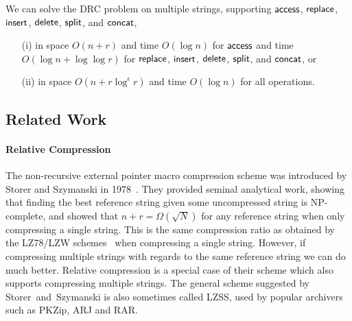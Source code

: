 \begin{theorem}\label{thm:extension2}
We can solve the DRC problem on multiple strings, supporting $\mathsf{access}$, $\mathsf{replace}$, $\mathsf{insert}$, $\mathsf{delete}$, $\mathsf{split}$, and $\mathsf{concat}$,
\begin{itemize}
\item[(i)] in space $O(n + r)$ and time $O(\log n)$ for $\mathsf{access}$ and time $O(\log n + \log\log r)$ for $\mathsf{replace}$, $\mathsf{insert}$, $\mathsf{delete}$, $\mathsf{split}$, and $\mathsf{concat}$, or
\item[(ii)] in space $O(n + r\log^\epsilon r)$ and time $O(\log n)$ for all operations.
\end{itemize}
\end{theorem}



\subsection{Related Work}\label{sec:related}
\paragraph{Relative Compression} 
The non-recursive external pointer macro compression scheme was introduced by Storer and Szymanski in 1978~\cite{SS1978,Storer1982}. They provided seminal analytical work, showing that finding the best reference string given some uncompressed string is NP-complete, and showed that $n+r = \Omega(\sqrt{N})$ for any reference string when only compressing a single string. This is the same compression ratio as obtained by the LZ78/LZW schemes~\cite{Welch1984,lz1978} when compressing a single string. However, if compressing multiple strings with regards to the same reference string we can do much better. Relative compression is a special case of their scheme which also supports compressing multiple strings. The general scheme suggested by Storer~and~Szymanski is also sometimes called LZSS, used by popular archivers such as PKZip, ARJ and RAR.


